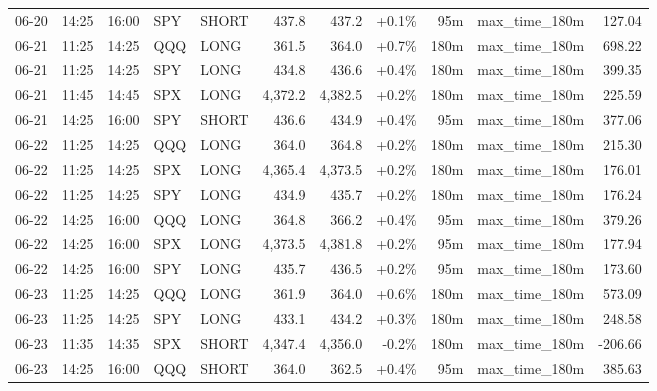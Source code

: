 \documentclass[11pt,a4paper,twoside]{article}
\begin{document}
\begin{center}
\begin{longtable}{>{\color{txtmain}}l l l l l r r r r >{\color{txtmain}}l r}
06-20 & 14:25 & 16:00 & SPY & SHORT & 437.8 & 437.2 & \textcolor{wingreen}{+0.1\%} & 95m & max\_time\_180m & \textcolor{wingreen}{127.04} \\
06-21 & 11:25 & 14:25 & QQQ & LONG & 361.5 & 364.0 & \textcolor{wingreen}{+0.7\%} & 180m & max\_time\_180m & \textcolor{wingreen}{698.22} \\
06-21 & 11:25 & 14:25 & SPY & LONG & 434.8 & 436.6 & \textcolor{wingreen}{+0.4\%} & 180m & max\_time\_180m & \textcolor{wingreen}{399.35} \\
06-21 & 11:45 & 14:45 & SPX & LONG & 4,372.2 & 4,382.5 & \textcolor{wingreen}{+0.2\%} & 180m & max\_time\_180m & \textcolor{wingreen}{225.59} \\
06-21 & 14:25 & 16:00 & SPY & SHORT & 436.6 & 434.9 & \textcolor{wingreen}{+0.4\%} & 95m & max\_time\_180m & \textcolor{wingreen}{377.06} \\
06-22 & 11:25 & 14:25 & QQQ & LONG & 364.0 & 364.8 & \textcolor{wingreen}{+0.2\%} & 180m & max\_time\_180m & \textcolor{wingreen}{215.30} \\
06-22 & 11:25 & 14:25 & SPX & LONG & 4,365.4 & 4,373.5 & \textcolor{wingreen}{+0.2\%} & 180m & max\_time\_180m & \textcolor{wingreen}{176.01} \\
06-22 & 11:25 & 14:25 & SPY & LONG & 434.9 & 435.7 & \textcolor{wingreen}{+0.2\%} & 180m & max\_time\_180m & \textcolor{wingreen}{176.24} \\
06-22 & 14:25 & 16:00 & QQQ & LONG & 364.8 & 366.2 & \textcolor{wingreen}{+0.4\%} & 95m & max\_time\_180m & \textcolor{wingreen}{379.26} \\
06-22 & 14:25 & 16:00 & SPX & LONG & 4,373.5 & 4,381.8 & \textcolor{wingreen}{+0.2\%} & 95m & max\_time\_180m & \textcolor{wingreen}{177.94} \\
06-22 & 14:25 & 16:00 & SPY & LONG & 435.7 & 436.5 & \textcolor{wingreen}{+0.2\%} & 95m & max\_time\_180m & \textcolor{wingreen}{173.60} \\
06-23 & 11:25 & 14:25 & QQQ & LONG & 361.9 & 364.0 & \textcolor{wingreen}{+0.6\%} & 180m & max\_time\_180m & \textcolor{wingreen}{573.09} \\
06-23 & 11:25 & 14:25 & SPY & LONG & 433.1 & 434.2 & \textcolor{wingreen}{+0.3\%} & 180m & max\_time\_180m & \textcolor{wingreen}{248.58} \\
06-23 & 11:35 & 14:35 & SPX & SHORT & 4,347.4 & 4,356.0 & \textcolor{lossred}{-0.2\%} & 180m & max\_time\_180m & \textcolor{lossred}{-206.66} \\
06-23 & 14:25 & 16:00 & QQQ & SHORT & 364.0 & 362.5 & \textcolor{wingreen}{+0.4\%} & 95m & max\_time\_180m & \textcolor{wingreen}{385.63} \\

\end{longtable}
\end{center}
\end{document}
